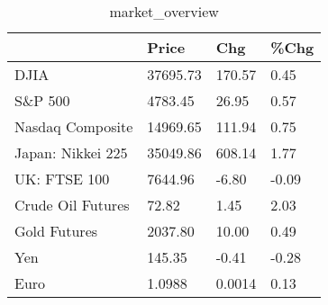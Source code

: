 \documentclass{article}%
\begin{document}
%


\begin{table}[htbp]%
\caption{market\_overview}%
\centering%
\begin{adjustbox}{width=1\textwidth}%
\begin{tabular}{llll}
\toprule
                  &    Price &    Chg &  \%Chg \\
\midrule
             DJIA & 37695.73 & 170.57 &  0.45 \\
          S\&P 500 &  4783.45 &  26.95 &  0.57 \\
 Nasdaq Composite & 14969.65 & 111.94 &  0.75 \\
Japan: Nikkei 225 & 35049.86 & 608.14 &  1.77 \\
     UK: FTSE 100 &  7644.96 &  -6.80 & -0.09 \\
Crude Oil Futures &    72.82 &   1.45 &  2.03 \\
     Gold Futures &  2037.80 &  10.00 &  0.49 \\
              Yen &   145.35 &  -0.41 & -0.28 \\
             Euro &   1.0988 & 0.0014 &  0.13 \\
\bottomrule
\end{tabular}
%
\end{adjustbox}%
\end{table}

%
\end{document}
